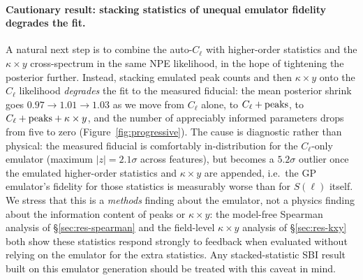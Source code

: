 \documentclass[11pt]{article}
\newcommand{\Sell}{S(\ell)}                    %
\newcommand{\kappay}{\kappa\times y}
\begin{document}
\paragraph{Cautionary result: stacking statistics of unequal emulator
fidelity degrades the fit.}
A natural next step is to combine the auto-$C_\ell$ with higher-order
statistics and the $\kappay$ cross-spectrum in the same NPE likelihood, in
the hope of tightening the posterior further. Instead, stacking emulated
peak counts and then $\kappay$ onto the $C_\ell$ likelihood
\emph{degrades} the fit to the measured fiducial: the mean posterior
shrink goes $0.97\to1.01\to1.03$ as we move from $C_\ell$ alone, to
$C_\ell+{\rm peaks}$, to $C_\ell+{\rm peaks}+\kappay$, and the number of
appreciably informed parameters drops from five to zero
(Figure~\ref{fig:progressive}). %
The cause is diagnostic rather than physical: the measured fiducial is
comfortably in-distribution for the $C_\ell$-only emulator (maximum
$|z|=2.1\sigma$ across features), but becomes a $5.2\sigma$ outlier once
the emulated higher-order statistics and $\kappay$ are appended, i.e.\ the
GP emulator's fidelity for those statistics is measurably worse than for
$\Sell$ itself. %
We stress that this is a \emph{methods} finding about the emulator, not a
physics finding about the information content of peaks or $\kappay$: the
model-free Spearman analysis of \S\ref{sec:res-spearman} and the
field-level $\kappay$ analysis of \S\ref{sec:res-kxy} both show these
statistics respond strongly to feedback when evaluated without relying on
the emulator for the extra statistics. Any stacked-statistic SBI result
built on this emulator generation should be treated with this caveat in
mind.
\end{document}
